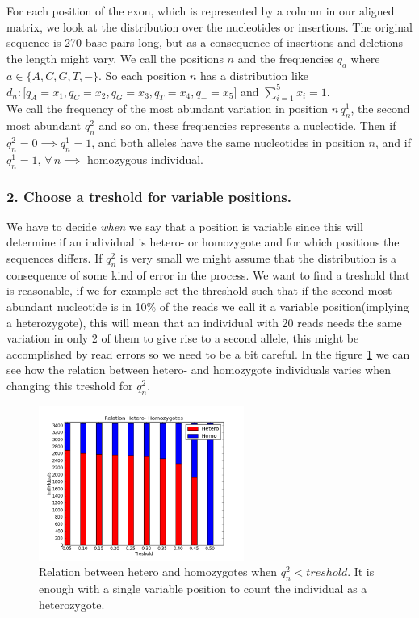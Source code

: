 For each position of the exon, which is represented by a column in our aligned matrix, we look at the distribution over the nucleotides or insertions. The original sequence is 270 base pairs long, but as a consequence of insertions and deletions the length might vary. We call the positions $n$ and the frequencies $q_a$ where $a\in \{A,C,G,T,-\}$. So each position $n$ has a distribution like $d_n: \lbrack q_A=x_1, q_C=x_2, q_G=x_3, q_T=x_4, q_{-}=x_5 \rbrack $ and $\sum_{i=1}^{5}x_i = 1$.\\
We call the frequency of the most abundant variation in position $n \, q_n^1$, the second most abundant $q_n^2$ and so on, these frequencies represents a nucleotide. Then if $q_n^2 = 0 \implies q_n^1=1$, and both alleles have the same nucleotides in position $n$, and if $q_n^1 = 1, \, \forall \, n \implies$ homozygous individual.

\subsubsection{2. Choose a treshold for variable positions.}

We have to decide \emph{when} we say that a position is variable since this will determine if an individual is hetero- or homozygote and for which positions the sequences differs. If $q_n^2$ is very small we might assume that the distribution is a consequence of some kind of error in the process. We want to find a treshold that is reasonable, if we for example set the threshold such that if the second most abundant nucleotide is in 10\% of the reads we call it a variable position(implying a heterozygote), this will mean that an individual with 20 reads needs the same variation in only 2 of them to give rise to a second allele, this might be accomplished by read errors so we need to be a bit careful. In the figure \ref{fig:het_hom_relation} we can see how the relation between hetero- and homozygote individuals varies when changing this treshold for $q_n^2$.

\begin{figure}[ht]
	\centering
		\includegraphics[width=0.6\textwidth]{../pictures/het_hom.png}
	\caption{Relation between hetero and homozygotes when $q_n^2 < treshold$. It is enough with a single variable position to count the individual as a heterozygote.}
	\label{fig:het_hom_relation}
\end{figure}


